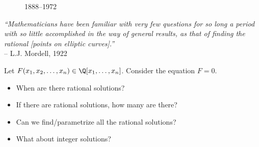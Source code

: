 {\begin{frame}[plain]
\begin{minipage}{0.2\textwidth}
\begin{figure}[h]
	{\small 1888--1972}
	\end{figure}
	\end{minipage}%
	\begin{minipage}{0.8\textwidth}
	\begin{center}
	{\itshape ``Mathematicians have been familiar with very few questions for so long a period with so little accomplished in the way of general results, as that of finding the rational [points on elliptic curves].''} \\
	 \phantom{x}\hfill-- L.J. Mordell, 1922
	\end{center}
 	\end{minipage}
\end{frame}
}



\begin{frame}[plain]

\begin{ques}
Let $F(x_1,x_2,\ldots,x_n) \in \Q[x_1,\ldots,x_n]$. Consider the equation $F= 0$.
\begin{itemize}
\item When are there rational solutions?
\item If there are rational solutions, how many are there?
\item Can we find/parametrize all the rational solutions?
\item What about integer solutions?
\end{itemize}
\end{ques}
\end{frame}



